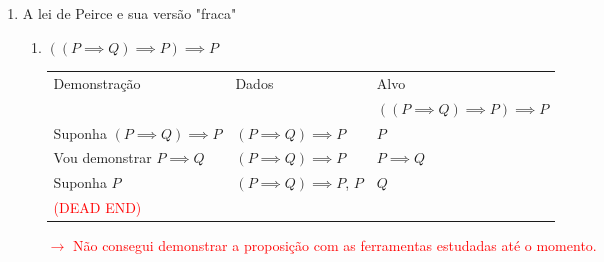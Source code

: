 \documentclass[a4paper, 12pt]{article}
\begin{document}
\begin{enumerate}
    \newpage
    \item A lei de Peirce e sua versão "fraca"
    \begin{enumerate}[1.]
        \item $((P \implies Q) \implies P) \implies P$
        \begin{table}[h!]
            \centering
            \begin{tabular}{|p{4cm} | p{4cm} | p{4cm} |}
            \rowcolor{gray!50}
            Demonstração & Dados & Alvo \\
            & & $((P \implies Q) \implies P) \implies P$\\
            Suponha $(P \implies Q) \implies P$ & $(P \implies Q) \implies P$ & $P$\\
            \hline
            \rowcolor{red!25}
            Vou demonstrar $P \implies Q$ & $(P \implies Q) \implies P$ & $P \implies Q$ \\
            \rowcolor{red!25}
            Suponha $P$  & $(P \implies Q) \implies P$, $P$ & $Q$ \\
            \rowcolor{red!25}
            \textcolor{red}{(DEAD END)} & & \\
            \hline
            \end{tabular}
        \end{table}

        \textcolor{red}{$\rightarrow$ Não consegui demonstrar a proposição com as ferramentas estudadas até o momento.}


\end{enumerate}
\end{enumerate}
\end{document}
